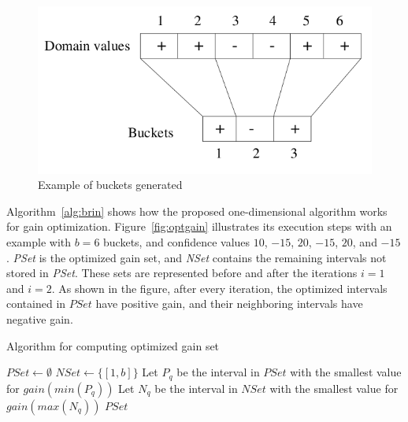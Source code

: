 \begin{figure}
\begin{center}
  \includegraphics[width=0.5\linewidth]{./Figures/brin-bucket.png}
\end{center}
\caption{Example of buckets generated~\citep{Brin99miningoptimized}}
\label{fig:brinbucket}
\end{figure}

Algorithm~\ref{alg:brin} shows how the proposed one-dimensional algorithm works for gain optimization.
Figure~\ref{fig:optgain} illustrates its execution steps with an example with $b=6$ buckets, and confidence values
$10$, $-15$, $20$, $-15$, $20$, and $-15$. \emph{PSet} is the optimized gain set, and \emph{NSet} contains the remaining
intervals not stored in \emph{PSet}. These sets are represented before and after the iterations $i=1$
and $i=2$. As shown in the figure, after every iteration, the optimized intervals contained in $PSet$ have positive
gain, and their neighboring intervals have negative gain.

\begin{algorithm}[h!]
 \caption{Algorithm for computing optimized gain set~\citep{Brin99miningoptimized}}
 \label{alg:brin}
  $PSet \leftarrow \emptyset$\;
  $NSet \leftarrow \{[1,b]\}$\;
   {
      Let $P_q$ be the interval in $PSet$ with the smallest value for $gain(min(P_q))$\;
      Let $N_q$ be the interval in $NSet$ with the smallest value for $gain(max(N_q))$\;
  }
  \Return $PSet$\;
\end{algorithm}

